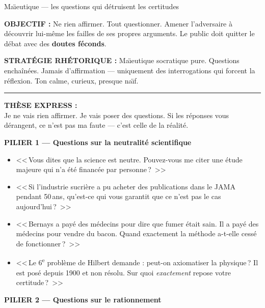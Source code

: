 \documentclass[a4paper,11pt]{article}
\begin{document}
\begin{fichebleu}{Ma\"{\i}eutique --- les questions qui d\'{e}truisent les certitudes}

\textbf{OBJECTIF :} Ne rien affirmer. Tout questionner. Amener l'adversaire \`{a} d\'{e}couvrir lui-m\^{e}me les failles de ses propres arguments. Le public doit quitter le d\'{e}bat avec des \textbf{doutes f\'{e}conds}.

\textbf{STRAT\'{E}GIE RH\'{E}TORIQUE :} Ma\"{\i}eutique socratique pure. Questions enchaîn\'{e}es. Jamais d'affirmation --- uniquement des interrogations qui forcent la r\'{e}flexion. Ton calme, curieux, presque na\"{\i}f.

\rule{\textwidth}{0.3pt}

\textbf{\color{ModeBleu}TH\`{E}SE EXPRESS :}\\
Je ne vais rien affirmer. Je vais poser des questions. Si les r\'{e}ponses vous d\'{e}rangent, ce n'est pas ma faute --- c'est celle de la r\'{e}alit\'{e}.

\vspace{0.3cm}
\textbf{\color{ModeBleu}PILIER 1 --- Questions sur la neutralit\'{e} scientifique}

\begin{itemize}[nosep, label=\color{ModeBleu}]
  \item <<\,Vous dites que la science est neutre. Pouvez-vous me citer une \'{e}tude majeure qui n'a \'{e}t\'{e} financ\'{e}e par personne\,?~>>
  \item <<\,Si l'industrie sucri\`{e}re a pu acheter des publications dans le JAMA pendant 50\,ans, qu'est-ce qui vous garantit que ce n'est pas le cas aujourd'hui\,?~>>
  \item <<\,Bernays a pay\'{e} des m\'{e}decins pour dire que fumer \'{e}tait sain. Il a pay\'{e} des m\'{e}decins pour vendre du bacon. Quand exactement la m\'{e}thode a-t-elle cess\'{e} de fonctionner\,?~>>
  \item <<\,Le 6\textsuperscript{e} probl\`{e}me de Hilbert demande : peut-on axiomatiser la physique\,? Il est pos\'{e} depuis 1900 et non r\'{e}solu. Sur quoi \emph{exactement} repose votre certitude\,?~>>
\end{itemize}

\vspace{0.3cm}
\textbf{\color{ModeBleu}PILIER 2 --- Questions sur le rationnement}


\end{fichebleu}
\end{document}
